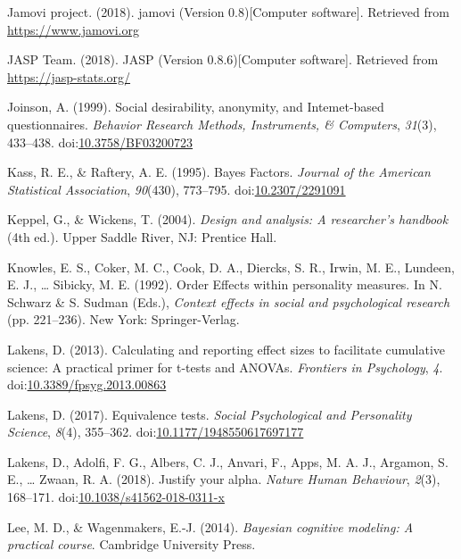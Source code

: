 \documentclass[english,man]{apa6}
\theoremstyle{definition}
\theoremstyle{definition}
\theoremstyle{definition}
\theoremstyle{remark}
\begin{document}
\hypertarget{ref-jamovi2018}{}
Jamovi project. (2018). jamovi (Version 0.8){[}Computer software{]}.
Retrieved from \url{https://www.jamovi.org}

\hypertarget{ref-JASP2018}{}
JASP Team. (2018). JASP (Version 0.8.6){[}Computer software{]}.
Retrieved from \url{https://jasp-stats.org/}

\hypertarget{ref-Joinson1999}{}
Joinson, A. (1999). Social desirability, anonymity, and Intemet-based
questionnaires. \emph{Behavior Research Methods, Instruments, \&
Computers}, \emph{31}(3), 433--438.
doi:\href{https://doi.org/10.3758/BF03200723}{10.3758/BF03200723}

\hypertarget{ref-Kass1995a}{}
Kass, R. E., \& Raftery, A. E. (1995). Bayes Factors. \emph{Journal of
the American Statistical Association}, \emph{90}(430), 773--795.
doi:\href{https://doi.org/10.2307/2291091}{10.2307/2291091}

\hypertarget{ref-Keppel2004}{}
Keppel, G., \& Wickens, T. (2004). \emph{Design and analysis: A
researcher's handbook} (4th ed.). Upper Saddle River, NJ: Prentice Hall.

\hypertarget{ref-Knowles1992}{}
Knowles, E. S., Coker, M. C., Cook, D. A., Diercks, S. R., Irwin, M. E.,
Lundeen, E. J., \ldots{} Sibicky, M. E. (1992). Order Effects within
personality measures. In N. Schwarz \& S. Sudman (Eds.), \emph{Context
effects in social and psychological research} (pp. 221--236). New York:
Springer-Verlag.

\hypertarget{ref-Lakens2013}{}
Lakens, D. (2013). Calculating and reporting effect sizes to facilitate
cumulative science: A practical primer for t-tests and ANOVAs.
\emph{Frontiers in Psychology}, \emph{4}.
doi:\href{https://doi.org/10.3389/fpsyg.2013.00863}{10.3389/fpsyg.2013.00863}

\hypertarget{ref-Lakens2017a}{}
Lakens, D. (2017). Equivalence tests. \emph{Social Psychological and
Personality Science}, \emph{8}(4), 355--362.
doi:\href{https://doi.org/10.1177/1948550617697177}{10.1177/1948550617697177}

\hypertarget{ref-Lakens2017}{}
Lakens, D., Adolfi, F. G., Albers, C. J., Anvari, F., Apps, M. A. J.,
Argamon, S. E., \ldots{} Zwaan, R. A. (2018). Justify your alpha.
\emph{Nature Human Behaviour}, \emph{2}(3), 168--171.
doi:\href{https://doi.org/10.1038/s41562-018-0311-x}{10.1038/s41562-018-0311-x}

\hypertarget{ref-Lee2012}{}
Lee, M. D., \& Wagenmakers, E.-J. (2014). \emph{Bayesian cognitive
modeling: A practical course}. Cambridge University Press.
\end{document}
